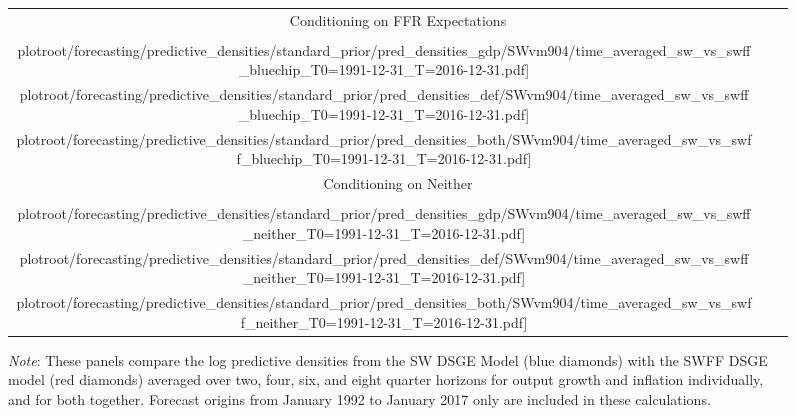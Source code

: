 \documentclass[12pt]{article}
\theoremstyle{definition}
\newcommand\plotroot{../figures_for_paper}
\begin{document}
\begin{figure}[h!]
\begin{center}
\begin{tabular}{@{\hspace*{-.4cm}}ccc}
            \multicolumn{3}{c}{Conditioning on FFR Expectations} \\[-.5ex]
            \texttt{[image: \\plotroot/forecasting/predictive\_densities/standard\_prior/pred\_densities\_gdp/SWvm904/time\_averaged\_sw\_vs\_swff\_bluechip\_T0=1991-12-31\_T=2016-12-31.pdf]} &
            \texttt{[image: \\plotroot/forecasting/predictive\_densities/standard\_prior/pred\_densities\_def/SWvm904/time\_averaged\_sw\_vs\_swff\_bluechip\_T0=1991-12-31\_T=2016-12-31.pdf]} &
            \texttt{[image: \\plotroot/forecasting/predictive\_densities/standard\_prior/pred\_densities\_both/SWvm904/time\_averaged\_sw\_vs\_swff\_bluechip\_T0=1991-12-31\_T=2016-12-31.pdf]} \\[-.5ex]
            \multicolumn{3}{c}{Conditioning on Neither} \\[-.5ex]
            \texttt{[image: \\plotroot/forecasting/predictive\_densities/standard\_prior/pred\_densities\_gdp/SWvm904/time\_averaged\_sw\_vs\_swff\_neither\_T0=1991-12-31\_T=2016-12-31.pdf]} &
            \texttt{[image: \\plotroot/forecasting/predictive\_densities/standard\_prior/pred\_densities\_def/SWvm904/time\_averaged\_sw\_vs\_swff\_neither\_T0=1991-12-31\_T=2016-12-31.pdf]} &
            \texttt{[image: \\plotroot/forecasting/predictive\_densities/standard\_prior/pred\_densities\_both/SWvm904/time\_averaged\_sw\_vs\_swff\_neither\_T0=1991-12-31\_T=2016-12-31.pdf]} \\[-.5ex]
        \end{tabular}
    \end{center}
    \begin{minipage}{\textwidth}
        \vspace{-.5cm}
        \scriptsize
        \setlength{\baselineskip}{2mm}
        \emph{Note}: These panels compare the log predictive densities from the SW DSGE Model (blue diamonds) with the SWFF DSGE model (red diamonds) averaged over two, four, six, and eight quarter horizons for output growth and inflation individually, and for both together. Forecast origins from January 1992 to January 2017 only are included in these calculations.
    \end{minipage}
\end{figure}
\end{document}
